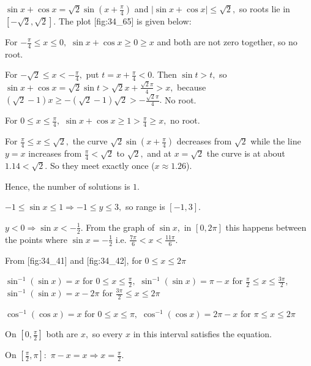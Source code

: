 \item $\sin x + \cos x = \sqrt{2}\sin\left(x + \frac{\pi}{4}\right)$ and $|\sin x + \cos x|\leq\sqrt{2},$ so roots lie
  in $[-\sqrt{2}, \sqrt{2}].$ The plot [fig:34_65] is given below:

  \startplacefigure[title={Plot of $\sin x + \cos x$ and $x$}, reference=fig:34_65]
    \externalfigure[34_65.pdf]
  \stopplacefigure

  For $-\frac{\pi}{4}\leq x\leq 0,$ $\sin x + \cos x\geq 0\geq x$ and both are not zero together, so no root.

  For $-\sqrt{2}\leq x < -\frac{\pi}{4},$ put $t = x + \frac{\pi}{4} < 0.$ Then $\sin t > t,$ so $\sin x + \cos x =
  \sqrt{2}\sin t > \sqrt{2}x + \frac{\sqrt{2}\pi}{4} > x,$ because $(\sqrt{2} - 1)x\geq -(\sqrt{2} - 1)\sqrt{2} >
  -\frac{\sqrt{2}\pi}{4}.$ No root.

  For $0\leq x\leq\frac{\pi}{4},$ $\sin x + \cos x\geq 1 > \frac{\pi}{4}\geq x,$ no root.

  For $\frac{\pi}{4}\leq x\leq\sqrt{2},$ the curve $\sqrt{2}\sin\left(x + \frac{\pi}{4}\right)$ decreases from
  $\sqrt{2}$ while the line $y = x$ increases from $\frac{\pi}{4} < \sqrt{2}$ to $\sqrt{2},$ and at $x = \sqrt{2}$ the
  curve is at about $1.14 < \sqrt{2}.$ So they meet exactly once ($x\approx 1.26$).

  Hence, the number of solutions is $1.$

\item $-1\leq\sin x\leq 1\Rightarrow -1\leq y\leq 3,$ so range is $[-1, 3].$

  $y < 0\Rightarrow\sin x < -\frac{1}{2}.$ From the graph of $\sin x,$ in $[0, 2\pi]$ this happens between the points
  where $\sin x = -\frac{1}{2}$ i.e. $\frac{7\pi}{6} < x < \frac{11\pi}{6}.$

\item From [fig:34_41] and [fig:34_42], for $0\leq x\leq 2\pi$

  $\sin^{-1}(\sin x) = x$ for $0\leq x\leq\frac{\pi}{2},$ $\sin^{-1}(\sin x) = \pi - x$ for $\frac{\pi}{2}\leq
  x\leq\frac{3\pi}{2},$ $\sin^{-1}(\sin x) = x - 2\pi$ for $\frac{3\pi}{2}\leq x\leq 2\pi$

  $\cos^{-1}(\cos x) = x$ for $0\leq x\leq\pi,$ $\cos^{-1}(\cos x) = 2\pi - x$ for $\pi\leq x\leq 2\pi$

  On $\left[0, \frac{\pi}{2}\right]$ both are $x,$ so every $x$ in this interval satisfies the equation.

  On $\left[\frac{\pi}{2}, \pi\right]:$ $\pi - x = x\Rightarrow x = \frac{\pi}{2}.$

